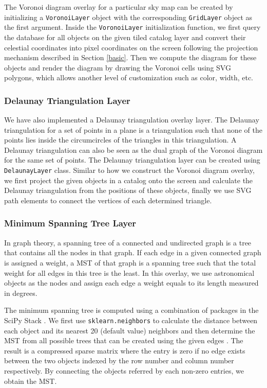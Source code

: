 \documentclass[../vis.tex]{subfiles}
\begin{document}
The Voronoi diagram overlay for a particular sky map can be created by initializing a \texttt{VoronoiLayer} object with the corresponding \texttt{GridLayer} object as the first argument.
Inside the \texttt{VoronoiLayer} initialization function, we first query the database for all objects on the given tiled catalog layer and convert their celestial coordinates into pixel coordinates on the screen following the projection mechanism described in Section \ref{basic}.
Then we compute the diagram for these objects and render the diagram by drawing the Voronoi cells using SVG polygons, which allows another level of customization such as color, width, etc.

\subsubsection{Delaunay Triangulation Layer}
We have also implemented a Delaunay triangulation overlay layer. The Delaunay triangulation for a set of points in a plane is a triangulation such that none of the points lies inside the circumcircles of the triangles in this triangulation.
A Delaunay triangulation can also be seen as the dual graph of the Voronoi diagram for the same set of points.
The Delaunay triangulation layer can be created using \texttt{DelaunayLayer} class. Similar to how we construct the Voronoi diagram overlay, we first project the given objects in a catalog onto the screen and calculate the Delaunay triangulation from the positions of these objects, finally we use SVG path elements to connect the vertices of each determined triangle.

\subsubsection{Minimum Spanning Tree Layer}
\label{mst}
In graph theory, a spanning tree of a connected and undirected graph is a tree that contains all the nodes in that graph.
If each edge in a given connected graph is assigned a weight, a MST of that graph is a spanning tree such that the total weight for all edges in this tree is the least.
In this overlay, we use astronomical objects as the nodes and assign each edge a weight equals to its length measured in degrees.

The minimum spanning tree is computed using a combination of packages in the SciPy Stack \citep{numpy, pandas, scipy, scikit-learn}. We first use \texttt{sklearn.neighbors} \citep{scikit-learn} to calculate the distance between each object and its nearest 20 (default value) neighbors and then determine the MST from all possible trees that can be created using the given edges \citep{scipy, Kruskal1956}.
The result is a compressed sparse matrix where the entry is zero if no edge exists between the two objects indexed by the row number and column number respectively.
By connecting the objects referred by each non-zero entries, we obtain the MST.
\end{document}
